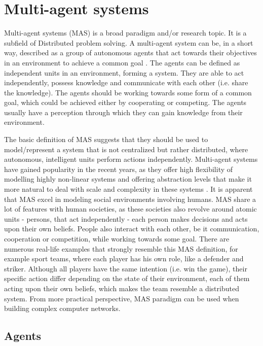 \documentclass[main.tex]{subfiles}
\begin{document}
\section{Multi-agent systems} \label{sec-mas}

Multi-agent systems (MAS) is a broad paradigm and/or research topic. It is a subfield of Distributed
problem solving. A multi-agent system can be, in a short way, described as a group
of autonomous agents that act towards their objectives in an environment to achieve a common goal
\cite{ParasumannaGokulan2010}. The agents can be defined as independent units in
an environment, forming a system. They are able to act independently, possess
knowledge and communicate with each other (i.e. share the knowledge). The agents
should be working towards some form of a common goal, which could be achieved
either by cooperating or competing.  The agents usually have a perception
through which they can gain knowledge from their environment.

The basic definition of MAS suggests that they should be used to model/represent
a system that is not centralized but rather distributed, where autonomous, intelligent units perform
actions independently. Multi-agent systems have gained popularity in the recent years, as they
offer high flexibility of modelling highly non-linear systems and offering abstraction levels that
make it more natural to deal with scale and complexity in these systems
\cite{Burmeister1997ApplicationOM}. It is apparent that MAS excel in modeling social environments
involving humans. MAS share a lot of features with human societies, as these societies also revolve
around atomic units - persons, that act independently - each person makes decisions and acts upon
their own beliefs. People also interact with each other, be it communication, cooperation or
competition, while working towards some goal. There are numerous real-life examples that strongly
resemble this MAS definition, for example sport teams, where each player has his own role, like
a defender and striker. Although all players have the same intention (i.e. win the game), their
specific action differ depending on the state of their environment, each of them acting upon their
own beliefs, which makes the team resemble a distributed system. From more practical perspective,
MAS paradigm can be used when building complex computer networks.

\subsection{Agents}
\end{document}
